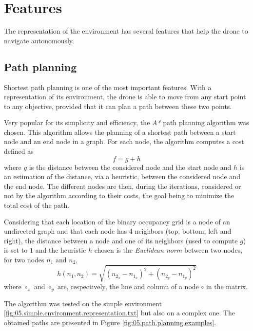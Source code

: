 \section{Features}\label{sec:05.features}

The representation of the environment has several features that help the drone to navigate autonomously.

\subsection{Path planning}

Shortest path planning is one of the most important features. With a representation of its environment, the drone is able to move from any start point to any objective, provided that it can plan a path between these two points.

Very popular for its simplicity and efficiency, the \emph{A*} path planning algorithm \cite{hart1968formal, medium2017astar} was chosen. This algorithm allows the planning of a shortest path between a start node and an end node in a graph. For each node, the algorithm computes a cost defined as
\begin{equation}
    f = g + h
\end{equation}
where $g$ is the distance between the considered node and the start node and $h$ is an estimation of the distance, via a heuristic, between the considered node and the end node. The different nodes are then, during the iterations, considered or not by the algorithm according to their costs, the goal being to minimize the total cost of the path.

Considering that each location of the binary occupancy grid is a node of an undirected graph and that each node has 4 neighbors (top, bottom, left and right), the distance between a node and one of its neighbors (used to compute $g$) is set to $1$ and the heuristic $h$ chosen is the \emph{Euclidean norm} between two nodes, \ie{} for two nodes $n_1$ and $n_2$,
\begin{equation}
    h(n_1, n_2) = \sqrt{(n_{2_x} - n_{1_x})^2 + (n_{2_y} - n_{1_y})^2}
\end{equation}
where $\circ_x$ and $\circ_y$ are, respectively, the line and column of a node $\circ$ in the matrix.

The algorithm was tested on the simple environment \ref{fig:05.simple.environment.representation.txt} but also on a complex one. The obtained paths are presented in Figure \ref{fig:05.path.planning.examples}.

